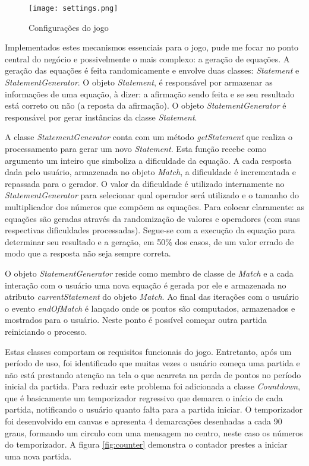 \begin{figure}[H]
    \centering
    \texttt{[image: settings.png]}
	\caption{Configurações do jogo}
    \label{fig:configurations}
\end{figure}

Implementados estes mecanismos essenciais para o jogo, pude me focar no
ponto central do negócio e possivelmente o mais complexo: a geração
de equações. A geração das equações é feita randomicamente e
envolve duas classes: \textit{Statement} e \textit{StatementGenerator}.
O objeto \textit{Statement}, é responsável por armazenar as
informações de uma equação, à dizer: a afirmação sendo feita
e se seu resultado está correto ou não (a reposta da afirmação).
O objeto \textit{StatementGenerator} é responsável por gerar
instâncias da classe \textit{Statement}.

A classe \textit{StatementGenerator} conta com um método
\textit{getStatement} que realiza o processamento para gerar um novo
\textit{Statement}. Esta função recebe como argumento um inteiro que
simboliza a dificuldade da equação. A cada resposta dada pelo usuário,
armazenada no objeto \textit{Match}, a dificuldade é incrementada
e repassada para o gerador. O valor da dificuldade é utilizado
internamente no \textit{StatementGenerator} para selecionar qual
operador será utilizado e o tamanho do multiplicador dos números
que compõem as equações. Para colocar claramente: as equações
são geradas através da randomização de valores e operadores (com
suas respectivas dificuldades processadas). Segue-se com a execução da
equação para determinar seu resultado e a geração, em 50\% dos
casos, de um valor errado de modo que a resposta não seja sempre
correta.

O objeto \textit{StatementGenerator} reside como membro de classe de
\textit{Match} e a cada interação com o usuário uma nova equação
é gerada por ele e armazenada no atributo \textit{currentStatement}
do objeto \textit{Match}. Ao final das iterações com o usuário o
evento \textit{endOfMatch} é lançado onde os pontos são computados,
armazenados e mostrados para o usuário. Neste ponto é possível
começar outra partida reiniciando o processo.

Estas classes comportam os requisitos funcionais do jogo. Entretanto,
após um período de uso, foi identificado que muitas vezes o usuário
começa uma partida e não está prestando atenção na tela o
que acarreta na perda de pontos no período inicial da partida. Para
reduzir este problema foi adicionada a classe \textit{Countdown},
que é basicamente um temporizador regressivo que demarca o início
de cada partida, notificando o usuário quanto falta para a partida
iniciar. O temporizador foi desenvolvido em canvas e apresenta 4
demarcações desenhadas a cada 90 graus, formando um circulo com uma
mensagem no centro, neste caso os números do temporizador. A figura
\ref{fig:counter} demonstra o contador prestes a iniciar uma nova
partida.

